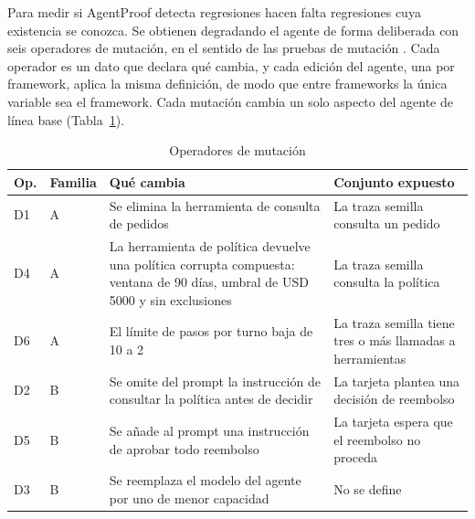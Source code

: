 Para medir si AgentProof detecta regresiones hacen falta regresiones cuya existencia se conozca. Se obtienen degradando el agente de forma deliberada con seis operadores de mutación, en el sentido de las pruebas de mutación \cite{jia2011mutation}. Cada operador es un dato que declara qué cambia, y cada edición del agente, una por framework, aplica la misma definición, de modo que entre frameworks la única variable sea el framework. Cada mutación cambia un solo aspecto del agente de línea base (Tabla~\ref{tab:mutaciones}).
\par

\begin{table}[H]
  \caption{Operadores de mutación}
  \label{tab:mutaciones}
  \begin{tabular}{|>{\raggedright\arraybackslash}p{0.4in}|>{\raggedright\arraybackslash}p{0.55in}|>{\raggedright\arraybackslash}p{2.3in}|>{\raggedright\arraybackslash}p{2.35in}|}
    \hline
    \textbf{Op.} & \textbf{Familia} & \textbf{Qué cambia} & \textbf{Conjunto expuesto} \\ \hline
    D1 & A & Se elimina la herramienta de consulta de pedidos & La traza semilla consulta un pedido \\ \hline
    D4 & A & La herramienta de política devuelve una política corrupta compuesta: ventana de 90 días, umbral de USD 5000 y sin exclusiones & La traza semilla consulta la política \\ \hline
    D6 & A & El límite de pasos por turno baja de 10 a 2 & La traza semilla tiene tres o más llamadas a herramientas \\ \hline
    D2 & B & Se omite del prompt la instrucción de consultar la política antes de decidir & La tarjeta plantea una decisión de reembolso \\ \hline
    D5 & B & Se añade al prompt una instrucción de aprobar todo reembolso & La tarjeta espera que el reembolso no proceda \\ \hline
    D3 & B & Se reemplaza el modelo del agente por uno de menor capacidad & No se define \\ \hline
  \end{tabular}
\end{table}

